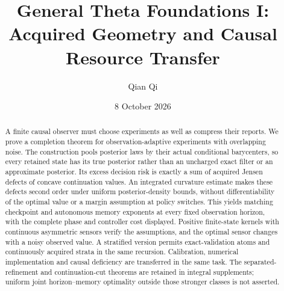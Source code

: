 \documentclass[11pt]{amsart}
\title{General Theta Foundations I:\\Acquired Geometry and Causal Resource Transfer}
\author{Qian Qi}\date{8 October 2026}
\theoremstyle{definition}\newtheorem{definition}[theorem]{Definition}
\theoremstyle{remark}\newtheorem{remark}[theorem]{Remark}
\begin{document}
\begin{abstract}
A finite causal observer must choose experiments as well as compress their reports. We prove a completion theorem for observation-adaptive experiments with overlapping noise. The construction pools posterior laws by their actual conditional barycenters, so every retained state has its true posterior rather than an uncharged exact filter or an approximate posterior. Its excess decision risk is exactly a sum of acquired Jensen defects of concave continuation values. An integrated curvature estimate makes these defects second order under uniform posterior-density bounds, without differentiability of the optimal value or a margin assumption at policy switches. This yields matching checkpoint and autonomous memory exponents at every fixed observation horizon, with the complete phase and controller cost displayed. Positive finite-state kernels with continuous asymmetric sensors verify the assumptions, and the optimal sensor changes with a noisy observed value. A stratified version permits exact-validation atoms and continuously acquired strata in the same recursion. Calibration, numerical implementation and causal deficiency are transferred in the same task. The separated-refinement and continuation-cut theorems are retained in integral supplements; uniform joint horizon--memory optimality outside those stronger classes is not asserted.
\end{abstract}
\maketitle






\appendix


\end{document}
